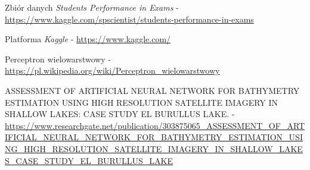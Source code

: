 \documentclass[12pt]{article}
\begin{document}
\begin{thebibliography}{9}

Zbiór danych  \textit{Students Performance in Exams} - \url{https://www.kaggle.com/spscientist/students-performance-in-exams}

Platforma \textit{Kaggle} - \url{https://www.kaggle.com/}

Perceptron wielowarstwowy - \url{https://pl.wikipedia.org/wiki/Perceptron_wielowarstwowy}

ASSESSMENT OF ARTIFICIAL NEURAL NETWORK FOR BATHYMETRY ESTIMATION USING HIGH RESOLUTION SATELLITE IMAGERY IN SHALLOW LAKES: CASE STUDY EL BURULLUS LAKE. - \url{https://www.researchgate.net/publication/303875065_ASSESSMENT_OF_ARTIFICIAL_NEURAL_NETWORK_FOR_BATHYMETRY_ESTIMATION_USING_HIGH_RESOLUTION_SATELLITE_IMAGERY_IN_SHALLOW_LAKES_CASE_STUDY_EL_BURULLUS_LAKE}

\end{thebibliography}
\end{document}
